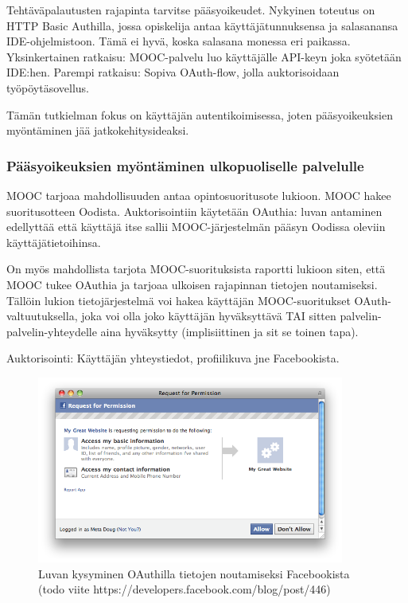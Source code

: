 \documentclass[finnish,gradu]{tktltiki}
\begin{document}
  Tehtäväpalautusten rajapinta tarvitse pääsyoikeudet. Nykyinen toteutus on HTTP Basic Authilla, jossa opiskelija antaa käyttäjätunnuksensa ja salasanansa IDE-ohjelmistoon. Tämä ei hyvä, koska salasana monessa eri paikassa. Yksinkertainen ratkaisu: MOOC-palvelu luo käyttäjälle API-keyn joka syötetään IDE:hen. Parempi ratkaisu: Sopiva OAuth-flow, jolla auktorisoidaan työpöytäsovellus.

  Tämän tutkielman fokus on käyttäjän autentikoimisessa, joten pääsyoikeuksien myöntäminen jää jatkokehitysideaksi.



  \subsubsection{Pääsyoikeuksien myöntäminen ulkopuoliselle palvelulle} %
  \label{ssub:jatkokehitysideoita_auktorisointi}
  MOOC tarjoaa mahdollisuuden antaa opintosuoritusote lukioon. MOOC hakee suoritusotteen Oodista. Auktorisointiin käytetään OAuthia: luvan antaminen edellyttää että käyttäjä itse sallii MOOC-järjestelmän pääsyn Oodissa oleviin käyttäjätietoihinsa.

  On myös mahdollista tarjota MOOC-suorituksista raportti lukioon siten, että MOOC tukee OAuthia ja tarjoaa ulkoisen rajapinnan tietojen noutamiseksi. Tällöin lukion tietojärjestelmä voi hakea käyttäjän MOOC-suoritukset OAuth-valtuutuksella, joka voi olla joko käyttäjän hyväksyttävä TAI sitten palvelin-palvelin-yhteydelle aina hyväksytty (implisiittinen ja sit se toinen tapa).

  Auktorisointi: Käyttäjän yhteystiedot, profiilikuva jne Facebookista.

  \begin{figure}
    \centering
    \includegraphics[width=0.9\textwidth]{images/facebook_authorization_contact_info.png}
    \caption{Luvan kysyminen OAuthilla tietojen noutamiseksi Facebookista (todo viite https://developers.facebook.com/blog/post/446)}
    \label{fig:luvan_kysyminen_oauth_fb}
  \end{figure}
\end{document}
